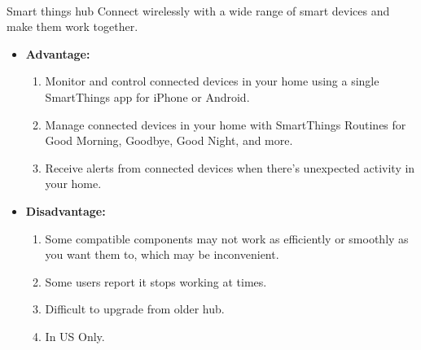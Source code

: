 \documentclass[a4paper, 12pt, oneside]{book}
\newcommand\boldcolor[1]{\textcolor{bold}{\textbf{#1}}}
\begin{document}
		\paragraph{}Smart things hub Connect wirelessly with a wide range of smart devices and make them work together\cite{samsung}.
		\begin{itemize}
			\item \boldcolor{Advantage:}
			\begin{enumerate}
				\item Monitor and control connected devices in your home using a single SmartThings app for iPhone or Android.
				\item Manage connected devices in your home with SmartThings Routines for Good Morning, Goodbye, Good Night, and more.
				\item Receive alerts from connected devices when there’s unexpected activity in your home.
				
			\end{enumerate}
			\item \boldcolor{Disadvantage:} 
			\begin{enumerate}
				\item Some compatible components may not work as efficiently or smoothly as you want them to, which may be inconvenient.
				\item Some users report it stops working at times.
				\item Difficult to upgrade from older hub.
				\item In US Only.
			\end{enumerate}
		\end{itemize}
\end{document}
